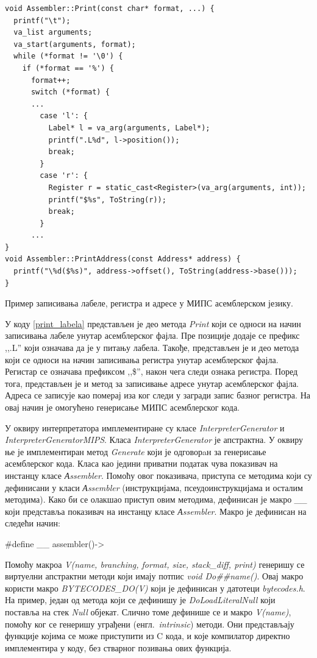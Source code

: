 \documentclass[12pt,oneside]{memoir}
\begin{document}
\begin{listing}
\begin{verbatim}
void Assembler::Print(const char* format, ...) {
  printf("\t");
  va_list arguments;
  va_start(arguments, format);
  while (*format != '\0') {
    if (*format == '%') {
      format++;
      switch (*format) {
      ...
        case 'l': {
          Label* l = va_arg(arguments, Label*);
          printf(".L%d", l->position());
          break;
        }
        case 'r': {
          Register r = static_cast<Register>(va_arg(arguments, int));
          printf("$%s", ToString(r));
          break;
        }
      ...
}
void Assembler::PrintAddress(const Address* address) {
  printf("\%d($%s)", address->offset(), ToString(address->base()));
}
\end{verbatim}
\caption{Пример записивања лабеле, регистра и адресе у МИПС асемблерском језику.}
\label{print_labela}
\end{listing}

У коду \ref{print_labela} представљен је део метода \textit{Print} који се односи на начин записивања лабеле унутар асемблерског фајла. Пре позиције додаје се префикс ,,.L'' који означава да је у питању лабела. Такође, представљен је и део метода који се односи на начин записивања регистра унутар асемблерског фајла. Регистар се означава префиксом ,,\$'', након чега следи ознака регистра. Поред тога, представљен је и метод за записивање адресе унутар асемблерског фајла. Адреса се записује као померај иза ког следи у загради запис базног регистра. На овај начин је омогућено генерисање МИПС асемблерског кода. 

У оквиру интерпретатора имплементиране су класе \textit{InterpreterGenerator} и \textit{InterpreterGeneratorMIPS}. Класа \textit{InterpreterGenerator} је апстрактна. У оквиру ње је имплементиран метод \textit{Generate} који је одговорaн за генерисање асемблерског кода. Класа као једини приватни податак чува показивач на инстанцу класе \textit{Аssembler}. Помоћу овог показивача, приступа се методима који су дефинисани у класи \textit{Аssembler} (инструкцијама, псеудоинструкцијама и осталим методима). Како би се олакшао приступ овим методима, дефинисан је макро \textit{\_\_} који представља показивач на инстанцу класе \textit{Аssembler}. Макро је дефинисан на следећи начин: 

\#define \_\_ assembler()->

Помоћу макроа \textit{V(name, branching, format, size, stack\_diff, print)} генеришу се виртуелни апстрактни методи који имају потпис \textit{void Do\#\#name()}. Овај макро користи макро \textit{BYTECODES\_DO(V)} који је дефинисан у датотеци \textit{bytecodes.h}. На пример, један од метода који се дефинишу је \textit{DoLoadLiteralNull} који поставља на стек \textit{Null} објекат. Слично томе дефинише се и макро \textit{V(name)}, помоћу ког се генеришу уграђени (енгл.~\textit{intrinsic}) методи. Они представљају функције којима се може приступити из C кода, и које компилатор директно имплементира у коду, без стварног позивања ових функција.
\end{document}
